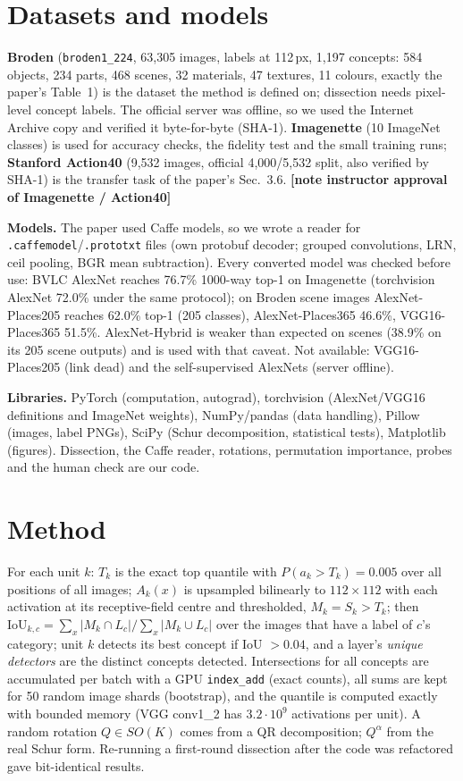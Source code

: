 \documentclass[10pt,a4paper]{article}
\newcommand{\fillin}[1]{\colorbox{yellow!40}{\textbf{[#1]}}}
\begin{document}
\section{Datasets and models}
\textbf{Broden} (\texttt{broden1\_224}, 63{,}305 images, labels at 112\,px, 1{,}197 concepts: 584 objects, 234 parts,
468 scenes, 32 materials, 47 textures, 11 colours, exactly the paper's Table~1) is the dataset the method is defined on;
dissection needs pixel-level concept labels. The official server was offline, so we used the Internet Archive copy and
verified it byte-for-byte (SHA-1). \textbf{Imagenette} (10 ImageNet classes) is used for accuracy checks, the fidelity test
and the small training runs; \textbf{Stanford Action40} (9{,}532 images, official 4{,}000/5{,}532 split, also verified by
SHA-1) is the transfer task of the paper's Sec.~3.6. \fillin{note instructor approval of Imagenette / Action40}

\textbf{Models.} The paper used Caffe models, so we wrote a reader for \texttt{.caffemodel}/\texttt{.prototxt} files
(own protobuf decoder; grouped convolutions, LRN, ceil pooling, BGR mean subtraction). Every converted model was checked
before use: BVLC AlexNet reaches 76.7\% 1000-way top-1 on Imagenette (torchvision AlexNet 72.0\% under the same
protocol); on Broden scene images AlexNet-Places205 reaches 62.0\% top-1 (205 classes), AlexNet-Places365 46.6\%,
VGG16-Places365 51.5\%. AlexNet-Hybrid is weaker than expected on scenes (38.9\% on its 205 scene outputs) and is used with
that caveat. Not available: VGG16-Places205 (link dead) and the self-supervised AlexNets (server offline).

\textbf{Libraries.} PyTorch (computation, autograd), torchvision (AlexNet/VGG16 definitions and ImageNet weights),
NumPy/pandas (data handling), Pillow (images, label PNGs), SciPy (Schur decomposition, statistical tests), Matplotlib
(figures). Dissection, the Caffe reader, rotations, permutation importance, probes and the human check are our code.

\section{Method}
For each unit $k$: $T_k$ is the exact top quantile with $P(a_k>T_k)=0.005$ over all positions of all images;
$A_k(x)$ is upsampled bilinearly to $112\times112$ with each activation at its receptive-field centre and thresholded,
$M_k=S_k>T_k$; then $\mathrm{IoU}_{k,c}=\sum_x|M_k\cap L_c|/\sum_x|M_k\cup L_c|$ over the images that have a label of
$c$'s category; unit $k$ detects its best concept if IoU $>0.04$, and a layer's \emph{unique detectors} are the distinct
concepts detected. Intersections for all concepts are accumulated per batch with a GPU \texttt{index\_add} (exact counts),
all sums are kept for 50 random image shards (bootstrap), and the quantile is computed exactly with bounded memory (VGG
conv1\_2 has $3.2\cdot10^9$ activations per unit). A random rotation $Q\in SO(K)$ comes from a QR decomposition; $Q^\alpha$
from the real Schur form. Re-running a first-round dissection after the code was refactored gave bit-identical results.
\end{document}
